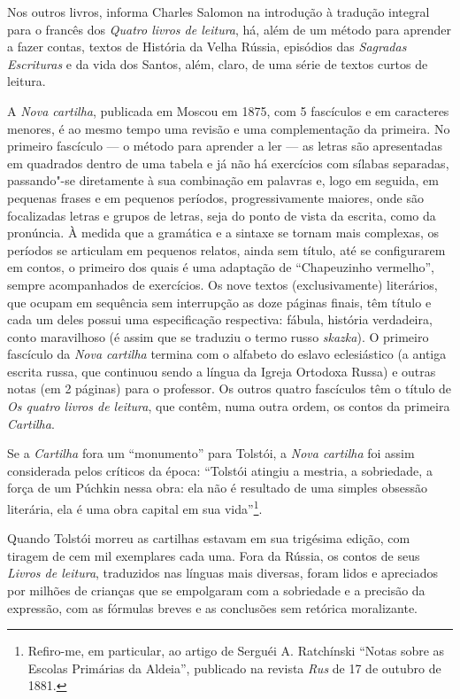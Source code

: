 Nos outros livros, informa Charles Salomon na introdução à
tradução integral para o francês dos \emph{Quatro livros de
leitura}, há, além de um método para aprender a fazer contas, textos de
História da Velha Rússia, episódios das \emph{Sagradas Escrituras} e da vida
dos Santos, além, claro, de uma série de textos curtos de leitura.

A \emph{Nova cartilha}, publicada em Moscou em 1875, com 5 fascículos e
em caracteres menores, é ao mesmo tempo uma revisão e uma complementação
da primeira. No primeiro fascículo --- o método para aprender a ler --- as
letras são apresentadas em quadrados dentro de uma tabela e já não há
exercícios com sílabas separadas, passando"-se diretamente à sua
combinação em palavras e, logo em seguida, em pequenas frases e em
pequenos períodos, progressivamente maiores, onde são focalizadas letras
e grupos de letras, seja do ponto de vista da escrita, como da
pronúncia. À medida que a gramática e a sintaxe se tornam mais
complexas, os períodos se articulam em pequenos relatos, ainda sem
título, até se configurarem em contos, o primeiro dos quais é uma
adaptação de ``Chapeuzinho vermelho'', sempre acompanhados de
exercícios. Os nove textos (exclusivamente) literários, que ocupam em
sequência sem interrupção as doze páginas finais, têm título e cada um
deles possui uma especificação respectiva: fábula, história verdadeira,
conto maravilhoso (é assim que se traduziu o termo
russo \emph{skazka}). O primeiro fascículo da \emph{Nova
cartilha} termina com o alfabeto do eslavo eclesiástico (a antiga
escrita russa, que continuou sendo a língua da Igreja Ortodoxa Russa) e
outras notas (em 2 páginas) para o professor. Os outros quatro
fascículos têm o título de \emph{Os quatro livros de leitura}, que
contêm, numa outra ordem, os contos da primeira \emph{Cartilha}.

Se a \emph{Cartilha} fora um ``monumento'' para Tolstói, a \emph{Nova
cartilha} foi assim considerada pelos críticos da época: ``Tolstói
atingiu a mestria, a sobriedade, a força de um Púchkin nessa obra: ela
não é resultado de uma simples obsessão literária, ela é uma obra
capital em sua vida''\footnote{Refiro-me, em particular, ao artigo
  de Serguéi A. Ratchínski ``Notas sobre as Escolas Primárias da
  Aldeia'', publicado na revista \emph{Rus} de 17 de outubro de 1881.}.

Quando Tolstói morreu as cartilhas estavam em sua trigésima edição, com
tiragem de cem mil exemplares cada uma. Fora da Rússia, os contos de
seus \emph{Livros de leitura}, traduzidos nas línguas mais diversas,
foram lidos e apreciados por milhões de crianças que se empolgaram com a
sobriedade e a precisão da expressão, com as fórmulas breves e as
conclusões sem retórica moralizante.

